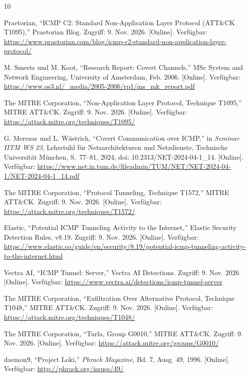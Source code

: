 \documentclass[11pt,a4paper]{article}
\begin{document}
\begin{thebibliography}{10}
 

Praetorian, ``ICMP C2: Standard Non-Application Layer Protocol (ATT\&CK
T1095),'' Praetorian Blog. Zugriff: 9. Nov. 2026. [Online]. Verfügbar:
\url{https://www.praetorian.com/blog/icmp-c2-standard-non-application-layer-protocol/}
 
M. Smeets und M. Koot, ``Research Report: Covert Channels,'' MSc System and
Network Engineering, University of Amsterdam, Feb. 2006. [Online]. Verfügbar:
\url{https://www.os3.nl/_media/2005-2006/rp1/ms_mk_report.pdf}
 
The MITRE Corporation, ``Non-Application Layer Protocol, Technique T1095,''
MITRE ATT\&CK. Zugriff: 9. Nov. 2026. [Online]. Verfügbar:
\url{https://attack.mitre.org/techniques/T1095/}
 
G. Merezas und L. Wüstrich, ``Covert Communication over ICMP,'' in \emph{Seminar
IITM WS 23}, Lehrstuhl für Netzarchitekturen und Netzdienste, Technische
Universität München, S.~77--81, 2024, doi: 10.2313/NET-2024-04-1\_14. [Online].
Verfügbar:
\url{https://www.net.in.tum.de/fileadmin/TUM/NET/NET-2024-04-1/NET-2024-04-1_14.pdf}
 
The MITRE Corporation, ``Protocol Tunneling, Technique T1572,'' MITRE ATT\&CK.
Zugriff: 9. Nov. 2026. [Online]. Verfügbar:
\url{https://attack.mitre.org/techniques/T1572/}
 
Elastic, ``Potential ICMP Tunneling Activity to the Internet,'' Elastic
Security Detection Rules, v8.19. Zugriff: 9. Nov. 2026. [Online]. Verfügbar:
\url{https://www.elastic.co/guide/en/security/8.19/potential-icmp-tunneling-activity-to-the-internet.html}
 
Vectra AI, ``ICMP Tunnel: Server,'' Vectra AI Detections. Zugriff: 9. Nov.
2026. [Online]. Verfügbar:
\url{https://www.vectra.ai/detections/icmp-tunnel-server}
 
The MITRE Corporation, ``Exfiltration Over Alternative Protocol, Technique
T1048,'' MITRE ATT\&CK. Zugriff: 9. Nov. 2026. [Online]. Verfügbar:
\url{https://attack.mitre.org/techniques/T1048/}
 
The MITRE Corporation, ``Turla, Group G0010,'' MITRE ATT\&CK. Zugriff: 9. Nov.
2026. [Online]. Verfügbar: \url{https://attack.mitre.org/groups/G0010/}
 
daemon9, ``Project Loki,'' \emph{Phrack Magazine}, Bd. 7, Ausg. 49, 1996.
[Online]. Verfügbar: \url{http://phrack.org/issues/49/}


\end{thebibliography}
\end{document}

